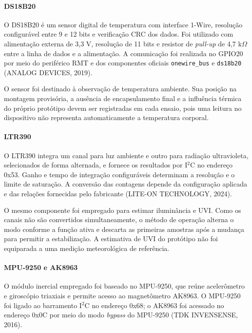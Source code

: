 \documentclass[a4paper,12pt]{article}
\begin{document}
\paragraph{DS18B20}


O DS18B20 \'e um sensor digital de temperatura com interface 1-Wire, resolu\c{c}\~ao configur\'avel entre 9 e 12 bits e verifica\c{c}\~ao CRC dos dados. Foi utilizado com alimenta\c{c}\~ao externa de 3,3 V, resolu\c{c}\~ao de 11 bits e resistor de \emph{pull-up} de 4,7 k$\Omega$ entre a linha de dados e a alimenta\c{c}\~ao. A comunica\c{c}\~ao foi realizada no GPIO20 por meio do perif\'erico RMT e dos componentes oficiais \texttt{onewire\_bus} e \texttt{ds18b20} (ANALOG DEVICES, 2019).


O sensor foi destinado \`a observa\c{c}\~ao de temperatura ambiente. Sua posi\c{c}\~ao na montagem provis\'oria, a aus\^encia de encapsulamento final e a influ\^encia t\'ermica do pr\'oprio prot\'otipo devem ser registradas em cada ensaio, pois uma leitura no dispositivo n\~ao representa automaticamente a temperatura corporal.


\paragraph{LTR390}


O LTR390 integra um canal para luz ambiente e outro para radia\c{c}\~ao ultravioleta, selecionados de forma alternada, e fornece os resultados por I$^2$C no endere\c{c}o 0x53. Ganho e tempo de integra\c{c}\~ao configur\'aveis determinam a resolu\c{c}\~ao e o limite de satura\c{c}\~ao. A convers\~ao das contagens depende da configura\c{c}\~ao aplicada e das rela\c{c}\~oes fornecidas pelo fabricante (LITE-ON TECHNOLOGY, 2024).


O mesmo componente foi empregado para estimar ilumin\^ancia e UVI. Como os canais n\~ao s\~ao convertidos simultaneamente, o m\'etodo de opera\c{c}\~ao alterna o modo conforme a fun\c{c}\~ao ativa e descarta as primeiras amostras ap\'os a mudan\c{c}a para permitir a estabiliza\c{c}\~ao. A estimativa de UVI do prot\'otipo n\~ao foi equiparada a uma medi\c{c}\~ao meteorol\'ogica de refer\^encia.


\paragraph{MPU-9250 e AK8963}


O m\'odulo inercial empregado foi baseado no MPU-9250, que re\'une aceler\^ometro e girosc\'opio triaxiais e permite acesso ao magnet\^ometro AK8963. O MPU-9250 foi ligado ao barramento I$^2$C no endere\c{c}o 0x68; o AK8963 foi acessado no endere\c{c}o 0x0C por meio do modo \emph{bypass} do MPU-9250 (TDK INVENSENSE, 2016).
\end{document}
